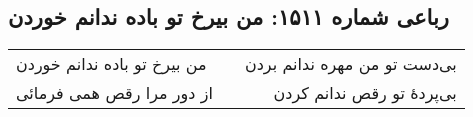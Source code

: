\begin{center}
\section*{رباعی شماره ۱۵۱۱: من بیرخ تو باده ندانم خوردن}
\label{sec:1511}
\begin{longtable}{l p{0.5cm} r}
من بیرخ تو باده ندانم خوردن
&&
بی‌دست تو من مهره ندانم بردن
\\
از دور مرا رقص همی فرمائی
&&
بی‌پردهٔ تو رقص ندانم کردن
\\
\end{longtable}
\end{center}
